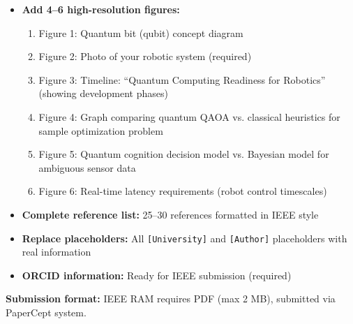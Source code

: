 \documentclass[journal]{IEEEtran}
\begin{document}
\begin{itemize}
\item \textbf{Add 4--6 high-resolution figures:}
\begin{enumerate}
\item Figure 1: Quantum bit (qubit) concept diagram
\item Figure 2: Photo of your robotic system (required)
\item Figure 3: Timeline: ``Quantum Computing Readiness for Robotics'' (showing development phases)
\item Figure 4: Graph comparing quantum QAOA vs. classical heuristics for sample optimization problem
\item Figure 5: Quantum cognition decision model vs. Bayesian model for ambiguous sensor data
\item Figure 6: Real-time latency requirements (robot control timescales)
\end{enumerate}

\item \textbf{Complete reference list:} 25--30 references formatted in IEEE style

\item \textbf{Replace placeholders:} All \texttt{[University]} and \texttt{[Author]} placeholders with real information

\item \textbf{ORCID information:} Ready for IEEE submission (required)
\end{itemize}

\textbf{Submission format:} IEEE RAM requires PDF (max 2 MB), submitted via PaperCept system.
\end{document}
